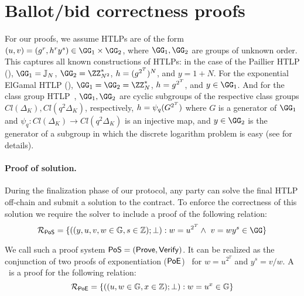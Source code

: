 \section{Ballot/bid correctness proofs}\label{sec:sigmas}

For our proofs, we assume HTLPs are of the form $(u,v) = (g^r, h^r y^s) \in \GG_1 \times \GG_2$, where $\GG_1, \GG_2$ are groups of unknown order. 
This captures all known constructions of HTLPs: in the case of the Paillier HTLP (), $\GG_1 = \mathbb{J}_N$, $\GG_2 = \ZZ_{N^2}^*$, $h = (g^{2^{T}})^N$, and $y = 1+N$. For the exponential ElGamal HTLP (), $\GG_1 = \GG_2 = \ZZ_N^*$, $h = g^{2^{T}}$, and $y \in \GG_1$. And for the class group HTLP~\cite{CCS:TCLM21}, $\GG_1,\GG_2$ are cyclic subgroups of the respective class groups $Cl(\Delta_K), Cl(q^2\Delta_K)$, respectively, $h = \psi_q(G^{2^{T}})$ where $G$ is a generator of $\GG_1$ and $\psi_q : Cl(\Delta_K) \to Cl(q^2 \Delta_K)$ is an injective map, and $y \in \GG_2$ is the generator of a subgroup in which the discrete logarithm problem is easy (see \cite{CCS:TCLM21} for details).

\paragraph{Proof of solution.}


% 

During the finalization phase of our protocol, any party can solve the final HTLP off-chain and submit a solution to the contract. To enforce the correctness of this solution we require the solver to include a proof of the following relation:
\begin{equation}
    \mathcal{R}_{\pos}=\{((y,u,v,w\in\mathbb{G},s\in\mathbb{Z});\bot): w = u^{2^\Ttime} \land\ v = w y^s \in \GG\}
\end{equation}

We call such a proof system ${\sf PoS} = (\mathsf{Prove}, \mathsf{Verify})$. It can be realized as the conjunction of two proofs of exponentiation ($\mathsf{PoE}$)~\cite{ITCS:Pietrzak19b,EC:Wesolowski19} for $w = u^{2^T}$ and $y^s = v/w$.
A \poe\ is a proof for the following relation:
\[
    \mathcal{R}_{\mathsf{PoE}}=\{((u,w\in\mathbb{G},x\in\mathbb{Z});\bot):w=u^{x}\in\mathbb{G}\}
\]

